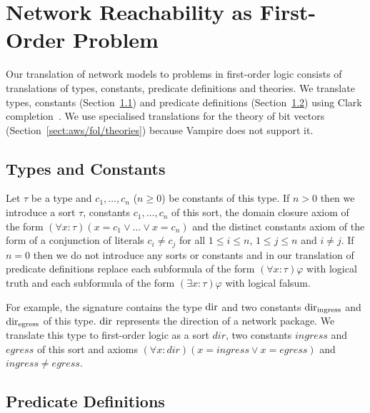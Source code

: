 \section{Network Reachability as First-Order Problem}\label{sect:aws/fol}
Our translation of network models to problems in first-order logic consists of translations of types, constants, predicate definitions and theories. We translate types, constants (Section~\ref{sect:aws/fol/types}) and predicate definitions (Section~\ref{sect:aws/fol/predicates}) using Clark completion~\cite{DBLP:conf/adbt/Clark77}. We use specialised translations for the theory of bit vectors (Section~\ref{sect:aws/fol/theories}) because Vampire does not support it.

\subsection{Types and Constants}\label{sect:aws/fol/types}
Let $\tau$ be a type and $c_1,\ldots,c_n$ ($n\ge0$) be constants of this type. If $n>0$ then we introduce a sort $\tau$, constants $c_1,\ldots,c_n$ of this sort, the domain closure axiom of the form $(\forall x:\tau)(x=c_1 \vee\ldots\vee x=c_n)$ and the distinct constants axiom of the form of a conjunction of literals $c_i\not=c_j$ for all $1\le i\le n$, $1\le j\le n$ and $i\not=j$. If $n=0$ then we do not introduce any sorts or constants and in our translation of predicate definitions replace each subformula of the form $(\forall x:\tau)\varphi$ with logical truth and each subformula of the form $(\exists x:\tau)\varphi$ with logical falsum.

For example, the signature contains the type $\mathrm{dir}$ and two constants $\mathrm{dir}_\text{ingress}$ and $\mathrm{dir}_\text{egress}$ of this type. $\mathrm{dir}$ represents the direction of a network package. We translate this type to first-order logic as a sort $\mathit{dir}$, two constants $\mathit{ingress}$ and $\mathit{egress}$ of this sort and axioms $(\forall x:\mathit{dir})(x=\mathit{ingress}\vee x=\mathit{egress})$ and $\mathit{ingress}\neq\mathit{egress}$.


\subsection{Predicate Definitions}\label{sect:aws/fol/predicates}

